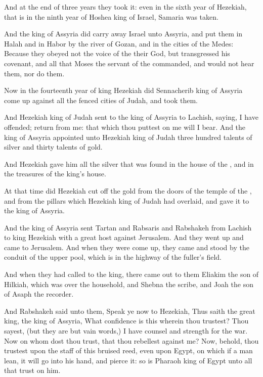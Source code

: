 \Verse And at the end of three years they took it: even in the sixth year of Hezekiah, that is in the ninth year of Hoshea king of Israel, Samaria was taken.

\Verse And the king of Assyria did carry away Israel unto Assyria, and put them in Halah and in Habor by the river of Gozan, and in the cities of the Medes: \Verse Because they obeyed not the voice of the \LORD their God, but transgressed his covenant, and all that Moses the servant of the \LORD commanded, and would not hear them, nor do them.

\Verse Now in the fourteenth year of king Hezekiah did Sennacherib king of Assyria come up against all the fenced cities of Judah, and took them.

\Verse And Hezekiah king of Judah sent to the king of Assyria to Lachish, saying, I have offended; return from me: that which thou puttest on me will I bear. And the king of Assyria appointed unto Hezekiah king of Judah three hundred talents of silver and thirty talents of gold.

\Verse And Hezekiah gave him all the silver that was found in the house of the \LORD, and in the treasures of the king's house.

\Verse At that time did Hezekiah cut off the gold from the doors of the temple of the \LORD, and from the pillars which Hezekiah king of Judah had overlaid, and gave it to the king of Assyria.

\Verse And the king of Assyria sent Tartan and Rabsaris and Rabshakeh from Lachish to king Hezekiah with a great host against Jerusalem. And they went up and came to Jerusalem. And when they were come up, they came and stood by the conduit of the upper pool, which is in the highway of the fuller's field.

\Verse And when they had called to the king, there came out to them Eliakim the son of Hilkiah, which was over the household, and Shebna the scribe, and Joah the son of Asaph the recorder.

\Verse And Rabshakeh said unto them, Speak ye now to Hezekiah, Thus saith the great king, the king of Assyria, What confidence is this wherein thou trustest?  \Verse Thou sayest, (but they are but vain words,) I have counsel and strength for the war. Now on whom dost thou trust, that thou rebellest against me?  \Verse Now, behold, thou trustest upon the staff of this bruised reed, even upon Egypt, on which if a man lean, it will go into his hand, and pierce it: so is Pharaoh king of Egypt unto all that trust on him.

